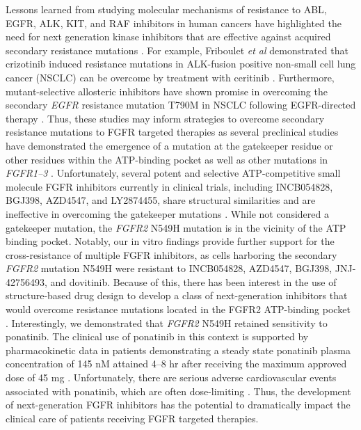 Lessons learned from studying molecular mechanisms of resistance to ABL, EGFR, ALK, KIT, and RAF inhibitors in human cancers have highlighted the need for next generation kinase inhibitors that are effective against acquired secondary resistance mutations \cite{demetri2011,gainor2013,hrustanovic2015,lito2013,roychowdhury2011_cml,vanallen2014}. For example, Friboulet \textit{et al} demonstrated that crizotinib induced resistance mutations in ALK-fusion positive non-small cell lung cancer (NSCLC) can be overcome by treatment with ceritinib \cite{friboulet2014}. Furthermore, mutant-selective allosteric inhibitors have shown promise in overcoming the secondary \textit{EGFR} resistance mutation T790M in NSCLC following EGFR-directed therapy \cite{jia2016}. Thus, these studies may inform strategies to overcome secondary resistance mutations to FGFR targeted therapies as several preclinical studies have demonstrated the emergence of a mutation at the gatekeeper residue or other residues within the ATP-binding pocket as well as other mutations in \textit{FGFR1--3} \cite{chell2013}. Unfortunately, several potent and selective ATP-competitive small molecule FGFR inhibitors currently in clinical trials, including INCB054828, BGJ398, AZD4547, and LY2874455, share structural similarities and are ineffective in overcoming the gatekeeper mutations \cite{chae2017}. While not considered a gatekeeper mutation, the \textit{FGFR2} N549H mutation is in the vicinity of the ATP binding pocket. Notably, our in vitro findings provide further support for the cross-resistance of multiple FGFR inhibitors, as cells harboring the secondary \textit{FGFR2} mutation N549H were resistant to INCB054828, AZD4547, BGJ398, JNJ-42756493, and dovitinib. Because of this, there has been interest in the use of structure-based drug design to develop a class of next-generation inhibitors that would overcome resistance mutations located in the FGFR2 ATP-binding pocket \cite{tan2014}. Interestingly, we demonstrated that \textit{FGFR2} N549H retained sensitivity to ponatinib. The clinical use of ponatinib in this context is supported by pharmacokinetic data in patients demonstrating a steady state ponatinib plasma concentration of 145 nM attained 4--8 hr after receiving the maximum approved dose of 45 mg \cite{cortes2012}. Unfortunately, there are serious adverse cardiovascular events associated with ponatinib, which are often dose-limiting \cite{nicolini2013}. Thus, the development of next-generation FGFR inhibitors has the potential to dramatically impact the clinical care of patients receiving FGFR targeted therapies.

